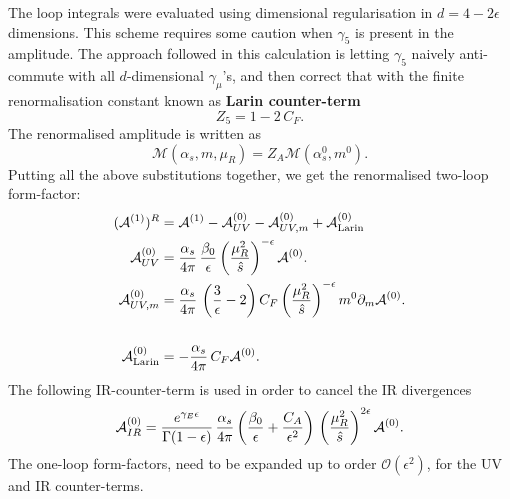 \par The loop integrals were evaluated using dimensional regularisation in $d= 4-2\epsilon$ dimensions. This scheme requires some caution when $\gamma_5$ is present in the amplitude. The approach followed in this calculation is letting $\gamma_5$ naively anti-commute with all $d$-dimensional $\gamma_\mu$'s, and then correct that with the finite renormalisation constant known as \textbf{Larin counter-term}~\cite{Larin:1993tq}
\begin{equation}
	Z_5 = 1- 2\, C_F.
\end{equation}
The renormalised amplitude is written as
\begin{equation}
	\mathcal M  (\alpha_s, m, \mu_R) = Z_A \mathcal M( \alpha_s^0, m^0).
\end{equation}
Putting all the above substitutions together, we get the renormalised two-loop form-factor:
\begin{align}
	( \mathcal A ^{(1)})^R &= 	\mathcal A ^{(1)} -	\mathcal A_{UV} ^{(0)}- 	\mathcal A_{UV, m} ^{(0)} + \mathcal A_{\text{Larin}} ^{(0)}   \\
	\mathcal A_{UV} ^{(0)} &= \frac{\alpha_s}{4 \pi}\,\frac{\beta_0}{\epsilon} \left( \frac{\mu_R^2}{\hat s} \right) ^{ -\epsilon} 	\mathcal A ^{(0)}.  \nonumber \\
	\mathcal A_{UV, m} ^{(0)} &= \frac{\alpha_s}{4 \pi} \, \left( \frac{3}{\epsilon} -2\right) C_F \left( \frac{\mu_R^2}{\hat s} \right) ^{ -\epsilon} m^0 \partial_m \mathcal A^{(0)} . \nonumber \\
	\\
	\mathcal	A_{\text{Larin}} ^{(0)}  &= - \frac{\alpha_s}{4 \pi} \, C_F  \mathcal A ^{(0)} .\nonumber
\end{align}
The following IR-counter-term is used in order to cancel the IR divergences
\begin{equation}
	\mathcal A_{IR} ^{(0)}  = \frac{e^{\gamma_E \epsilon}}{\Gamma(1-\epsilon)} \, \frac{\alpha_s}{4 \pi} \left( \frac{\beta_0}{\epsilon} + \frac{ C_A}{\epsilon^2} \right)  \, \left(  \frac{\mu_R^2}{\hat s}\right) ^{2\epsilon} \mathcal A ^{(0)}.
\end{equation}
The one-loop form-factors, need to be expanded up to order $ \mathcal O(\epsilon^2) $, for the UV and IR counter-terms.
